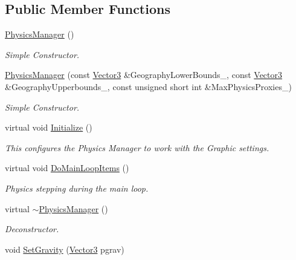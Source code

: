 \subsection*{Public Member Functions}
\begin{DoxyCompactItemize}
\item 
\hyperlink{classphys_1_1PhysicsManager_ab3ecdc295799ad9858ca80743b25006d}{PhysicsManager} ()
\begin{DoxyCompactList}\small\item\em Simple Constructor. \item\end{DoxyCompactList}\item 
\hyperlink{classphys_1_1PhysicsManager_a1072c647c64ec82381ddc9f1a17c5909}{PhysicsManager} (const \hyperlink{classphys_1_1Vector3}{Vector3} \&GeographyLowerBounds\_\-, const \hyperlink{classphys_1_1Vector3}{Vector3} \&GeographyUpperbounds\_\-, const unsigned short int \&MaxPhysicsProxies\_\-)
\begin{DoxyCompactList}\small\item\em Simple Constructor. \item\end{DoxyCompactList}\item 
virtual void \hyperlink{classphys_1_1PhysicsManager_a28885be750bb763d957f122593815388}{Initialize} ()
\begin{DoxyCompactList}\small\item\em This configures the Physics Manager to work with the Graphic settings. \item\end{DoxyCompactList}\item 
virtual void \hyperlink{classphys_1_1PhysicsManager_a62741a2582ac9bfd0255cf8a3ad2310c}{DoMainLoopItems} ()
\begin{DoxyCompactList}\small\item\em Physics stepping during the main loop. \item\end{DoxyCompactList}\item 
virtual \hyperlink{classphys_1_1PhysicsManager_a4898702f889c6b4aa7c0b59991d310b0}{$\sim$PhysicsManager} ()
\begin{DoxyCompactList}\small\item\em Deconstructor. \item\end{DoxyCompactList}\item 
void \hyperlink{classphys_1_1PhysicsManager_a3e74f3e0288706d44dc90657a8fa1118}{SetGravity} (\hyperlink{classphys_1_1Vector3}{Vector3} pgrav)

\end{DoxyCompactItemize}
